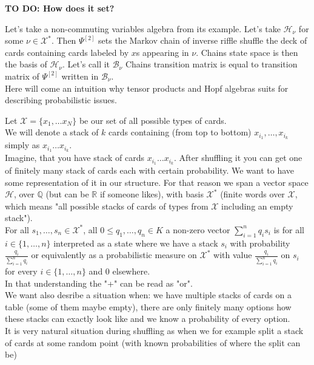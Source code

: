 \documentclass[a4paper, 12pt]{report}
\newcommand{\todo}[1]{\hfill \break \textbf{\Huge TO DO: #1 \hfill \break}\normalsize}
\begin{document}
\todo{How does it set?}

Let's take a non-commuting variables algebra from its example. Let's take $\mathcal{H}_\nu$ for some
$\nu \in \mathcal{X}^*$. Then $\Psi^{[2]}$ sets the Markov chain of inverse riffle shuffle the deck of cards
containing cards labeled by $x$s appearing in $\nu$. Chains state space is then the basis of
$\mathcal{H}_\nu$. Let's call it $\mathcal{B}_\nu$
Chains transition matrix is equal to transition matrix of $\Psi^{[2]}$ written in $\mathcal{B}_\nu$.  \\

Here will come an intuition why tensor products and Hopf algebras suits for describing probabilistic issues.

Let $\mathcal{X} = \{x_1, \dots x_N\}$ be our set of all possible types of cards. \\
We will denote a stack of $k$ cards containing (from top to bottom) $x_{i_1}, \dots, x_{i_k}$ simply as
$x_{i_1}\dots x_{i_k}$. \\
Imagine, that you have stack of cards $x_{i_1}\dots x_{i_k}$. After shuffling it
you can get one of finitely many stack of cards each with certain probability. We want to have some
representation of it in our structure.
For that reason we span a vector space $\mathcal{H}$, over $\mathbb{Q}$ (but can be $\mathbb{R}$ if someone
likes),
with basis $\mathcal{X}^*$ (finite words over $\mathcal{X}$, which means "all possible stacks
of cards of types from $\mathcal{X}$ including an empty stack"). \\
For all $s_1, \dots, s_n \in \mathcal{X}^*$, all $0 \leq q_1, \dots, q_n \in K$ a non-zero vector
$\displaystyle\sum^{n}_{i = 1} q_is_i$ is for all $i \in \{1, \dots, n\}$
interpreted as a state where we have a stack $s_i$ with probability $\frac{q_i}{\sum^n_{i=1} q_i}$ or
equivalently as a probabilistic measure on $\mathcal{X}^*$ with value $\frac{q_i}{\sum^n_{i=1} q_i}$ on $s_i$
for every $i \in \{1, \dots, n\}$ and $0$ elsewhere. \\
In that understanding the "+" can be read as "or". \\
We want also desribe a situation when: we have multiple stacks of cards on a table (some of them maybe
empty), there are only finitely many options how
these stacks can exactly look like and we know a probability of every option.\\
It is very natural situation during shuffling as when we for example split a stack of cards at some
random point (with known probabilities of where the split can be)
\end{document}
